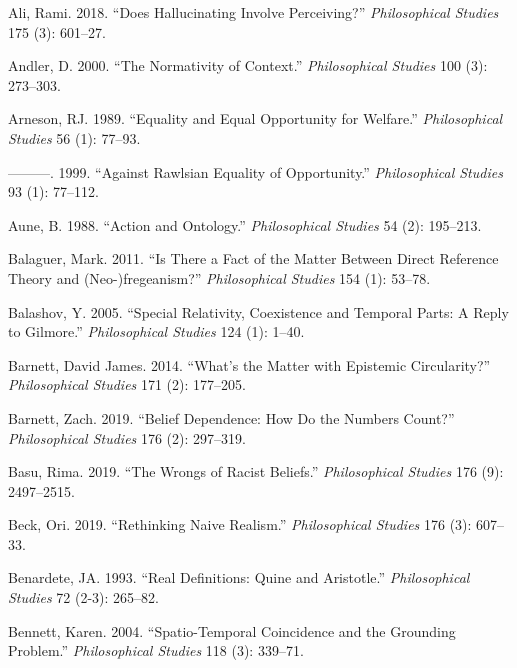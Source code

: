 \documentclass[
  10pt,
  letterpaper,
  DIV=11,
  numbers=noendperiod,
  twoside]{scrartcl}
\newlength{\cslhangindent}
\newenvironment{CSLReferences}[2] %
 {\begin{list}{}{%
  \setlength{\itemindent}{0pt}
  \setlength{\leftmargin}{0pt}
  \setlength{\parsep}{0pt}
  \ifodd #1
   \setlength{\leftmargin}{\cslhangindent}
   \setlength{\itemindent}{-1\cslhangindent}
  \fi
  \setlength{\itemsep}{#2\baselineskip}}}
 {\end{list}}
\begin{document}
\label{refs}
\begin{CSLReferences}{1}{0}
Ali, Rami. 2018. {``Does Hallucinating Involve Perceiving?''}
\emph{Philosophical Studies} 175 (3): 601--27.

Andler, D. 2000. {``The Normativity of Context.''} \emph{Philosophical
Studies} 100 (3): 273--303.

Arneson, RJ. 1989. {``Equality and Equal Opportunity for Welfare.''}
\emph{Philosophical Studies} 56 (1): 77--93.

---------. 1999. {``Against Rawlsian Equality of Opportunity.''}
\emph{Philosophical Studies} 93 (1): 77--112.

Aune, B. 1988. {``Action and Ontology.''} \emph{Philosophical Studies}
54 (2): 195--213.

Balaguer, Mark. 2011. {``Is There a Fact of the Matter Between Direct
Reference Theory and (Neo-)fregeanism?''} \emph{Philosophical Studies}
154 (1): 53--78.

Balashov, Y. 2005. {``Special Relativity, Coexistence and Temporal
Parts: A Reply to Gilmore.''} \emph{Philosophical Studies} 124 (1):
1--40.

Barnett, David James. 2014. {``What's the Matter with Epistemic
Circularity?''} \emph{Philosophical Studies} 171 (2): 177--205.

Barnett, Zach. 2019. {``Belief Dependence: How Do the Numbers Count?''}
\emph{Philosophical Studies} 176 (2): 297--319.

Basu, Rima. 2019. {``The Wrongs of Racist Beliefs.''}
\emph{Philosophical Studies} 176 (9): 2497--2515.

Beck, Ori. 2019. {``Rethinking Naive Realism.''} \emph{Philosophical
Studies} 176 (3): 607--33.

Benardete, JA. 1993. {``Real Definitions: Quine and Aristotle.''}
\emph{Philosophical Studies} 72 (2-3): 265--82.

Bennett, Karen. 2004. {``Spatio-Temporal Coincidence and the Grounding
Problem.''} \emph{Philosophical Studies} 118 (3): 339--71.


\end{CSLReferences}
\end{document}
